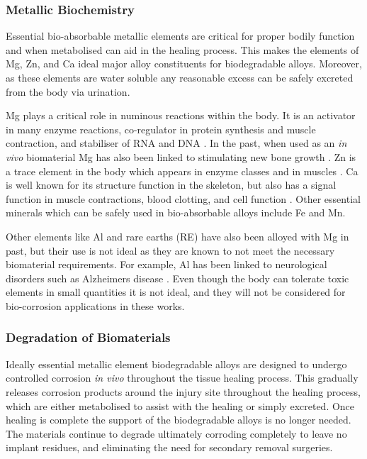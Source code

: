 \documentclass[a4paper,12pt,oneside]{report}%
\begin{document}
\subsubsection{Metallic Biochemistry}
Essential bio-absorbable metallic elements are critical for proper bodily function and when metabolised can aid in the healing process. This makes the elements of Mg, Zn, and Ca ideal major alloy constituents for biodegradable alloys. Moreover, as these elements are water soluble any reasonable excess can be safely excreted from the body via urination.

Mg plays a critical role in numinous reactions within the body. It is an activator in many enzyme reactions, co-regulator in protein synthesis and muscle contraction, and stabiliser of RNA and DNA \cite{Zheng2014} . In the past, when used as an \textit{in vivo} biomaterial Mg has also been linked to stimulating new bone growth  \cite{Witte2010}. Zn is a trace element in the body which appears in enzyme classes and in muscles \cite{Zheng2014}. Ca is well known for its structure function in the skeleton, but also has a signal function in muscle contractions, blood clotting, and cell function \cite{Zheng2014}. Other essential minerals which can be safely used in bio-absorbable alloys include Fe and Mn.

Other elements like Al and rare earths (RE) have also been alloyed with Mg in past, but their use is not ideal as they are known to not meet the necessary biomaterial requirements. For example, Al has been linked to neurological disorders such as Alzheimers disease \cite{Zheng2014}. Even though the body can tolerate toxic elements in small quantities it is not ideal, and they will not be considered for bio-corrosion applications in these works. 

\subsubsection{Degradation of Biomaterials} 
Ideally essential metallic element biodegradable alloys are designed to undergo controlled corrosion \textit{in vivo} throughout the tissue healing process. This gradually releases corrosion products around the injury site throughout the healing process, which are either metabolised to assist with the healing or simply excreted. Once healing is complete the support of the biodegradable alloys is no longer needed. The materials continue to degrade ultimately corroding completely to leave no implant residues, and eliminating the need for secondary removal surgeries.  
\end{document}
